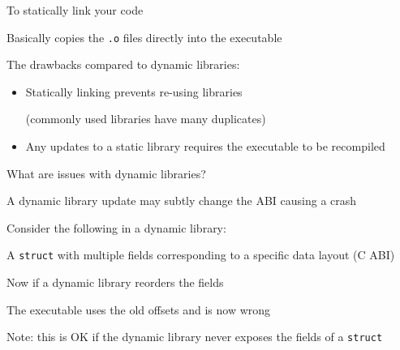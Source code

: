   \begin{slide}

    To statically link your code

    \leftspace{}Basically copies the \texttt{.o} files directly into the
    executable
    \bigskip

    The drawbacks compared to dynamic libraries:
    \begin{itemize}
      \item Statically linking prevents re-using libraries
      
            (commonly used libraries have many duplicates)
      \item Any updates to a static library requires the executable to be
            recompiled
    \end{itemize}
    \bigskip

    What are issues with dynamic libraries?
  \end{slide}

\begin{slide}

    A dynamic library update may subtly change the ABI causing a crash
    \medskip

    Consider the following in a dynamic library:

    \leftspace{}A \texttt{struct} with multiple fields corresponding to
    a specific data layout (C ABI)
    \medskip

    \bigskip

    Now if a dynamic library reorders the fields

    \leftspace{} The executable uses the old offsets and is now wrong
    \medskip

    Note: this is OK if the dynamic library never exposes the fields of a
    \texttt{struct}
  \end{slide}

